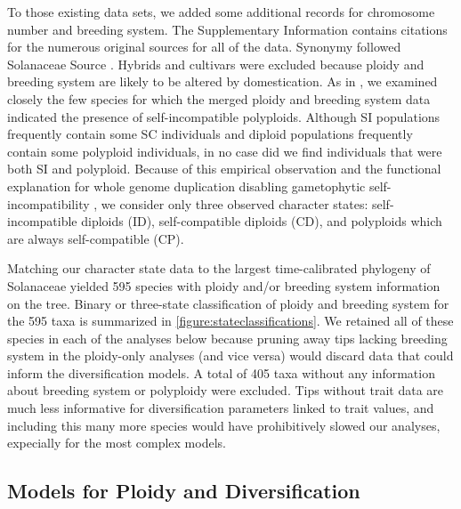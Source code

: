 To those existing data sets, we added some additional records for chromosome number and breeding system.
The Supplementary Information contains citations for the numerous original sources for all of the data. %
Synonymy followed Solanaceae Source \citep{solsource}.
Hybrids and cultivars were excluded because ploidy and breeding system are likely to be altered by domestication.
As in \citet{robertson_2011}, we examined closely the few species for which the merged ploidy and breeding system data indicated the presence of self-incompatible polyploids.
Although SI populations frequently contain some SC individuals and diploid populations frequently contain some polyploid individuals, in no case did we find individuals that were both SI and polyploid.
Because of this empirical observation and the functional explanation for whole genome duplication disabling gametophytic self-incompatibility \citep[reviewed in][]{ramsey_1998,stone_2002}, we consider only three observed character states: self-incompatible diploids (ID), self-compatible diploids (CD), and polyploids which are always self-compatible (CP).


Matching our character state data to the largest time-calibrated phylogeny of Solanaceae \citep{sarkinen_2013} yielded 595 species with ploidy and/or breeding system information on the tree.
Binary or three-state classification of ploidy and breeding system for the 595 taxa is summarized in \cref{figure:stateclassifications}.
We retained all of these species in each of the analyses below because pruning away tips lacking breeding system in the ploidy-only analyses (and vice versa) would discard data that could inform the diversification models.
A total of 405 taxa without any information about breeding system or polyploidy were excluded.
Tips without trait data are much less informative for diversification parameters linked to trait values, and including this many more species would have prohibitively slowed our analyses, expecially for the most complex models.

\subsection{Models for Ploidy and Diversification}


